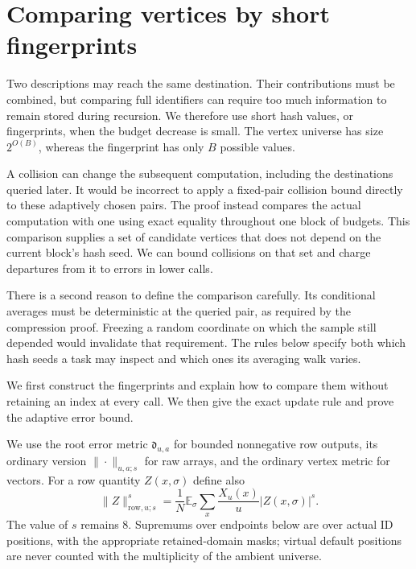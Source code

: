 \section{Comparing vertices by short fingerprints}
\label{sec:fp-blocks}

Two descriptions may reach the same destination. Their contributions must be combined, but comparing full identifiers can require too much information to remain stored during recursion. We therefore use short hash values, or fingerprints, when the budget decrease is small. The vertex universe has size $2^{O(B)}$, whereas the fingerprint has only $B$ possible values.

A collision can change the subsequent computation, including the destinations queried later. It would be incorrect to apply a fixed-pair collision bound directly to these adaptively chosen pairs. The proof instead compares the actual computation with one using exact equality throughout one block of budgets. This comparison supplies a set of candidate vertices that does not depend on the current block's hash seed. We can bound collisions on that set and charge departures from it to errors in lower calls.

There is a second reason to define the comparison carefully. Its conditional averages must be deterministic at the queried pair, as required by the compression proof. Freezing a random coordinate on which the sample still depended would invalidate that requirement. The rules below specify both which hash seeds a task may inspect and which ones its averaging walk varies.

We first construct the fingerprints and explain how to compare them without retaining an index at every call. We then give the exact update rule and prove the adaptive error bound.

We use the root error metric $\mathfrak d_{u,a}$ for bounded nonnegative row
outputs, its ordinary version $\|\cdot\|_{u,a;s}$ for raw arrays, and the
ordinary vertex metric for vectors.  For a row quantity $Z(x,\sigma)$ define
also
\begin{equation}
 \|Z\|_{\mathrm{row},u;s}^s
 =\frac1N\mathbb E_\sigma\sum_x\frac{X_u(x)}u|Z(x,\sigma)|^s.
 \label{eq:fp-row-measure}
\end{equation}
The value of $s$ remains $8$.  Supremums over endpoints below are over actual
ID positions, with the appropriate retained-domain masks; virtual default
positions are never counted with the multiplicity of the ambient universe.

